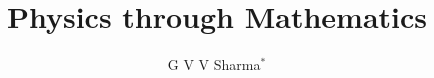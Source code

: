 \documentclass[journal,12pt,onecolumn]{IEEEtran}
\begin{document}
\title{
	Physics through Mathematics
}
\author{ G V V Sharma$^{*}$%
\iffalse
	\thanks{*The author is with the Department
		of Electrical Engineering, Indian Institute of Technology, Hyderabad
		502285 India e-mail:  gadepall@iith.ac.in. All content in this manual is released under GNU GPL.  Free and open source.}
		\fi
	
}	


%
%
%

% 
%



% 
\end{document}
